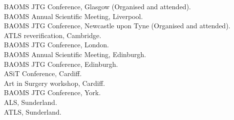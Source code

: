  BAOMS JTG Conference, Glasgow (Organised and attended). \\
 BAOMS Annual Scientific Meeting, Liverpool. \\
 BAOMS JTG Conference, Newcastle upon Tyne (Organised and attended). \\
 ATLS reverification, Cambridge. \\
 BAOMS JTG Conference, London. \\
 BAOMS Annual Scientific Meeting, Edinburgh. \\
 BAOMS JTG Conference, Edinburgh. \\
 ASiT Conference, Cardiff. \\
 Art in Surgery workshop, Cardiff. \\
 BAOMS JTG Conference, York. \\
 ALS, Sunderland. \\
 ATLS, Sunderland. \\




